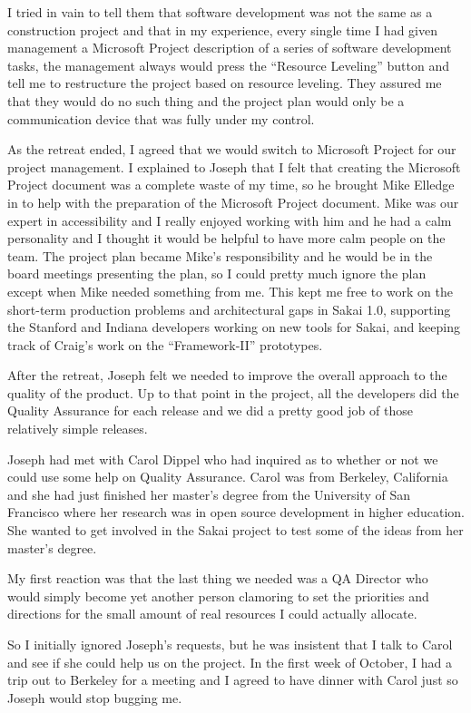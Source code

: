 \documentclass[12pt]{book}
\begin{document}
I tried in vain to tell them that software development
was not the same as a construction project and that
in my experience, every single time I had given management
a Microsoft Project description of a series of software
development tasks, the management always would press
the ``Resource Leveling'' button and tell me to
restructure the project based on resource leveling.
They assured me that they would do no such thing and
the project plan would only be a communication device
that was fully under my control.

As the retreat ended, I agreed that we would switch
to Microsoft Project for our project management.
I explained to Joseph that I felt that creating the Microsoft Project
document was a complete waste of my time, so he
brought Mike Elledge in to help with the preparation
of the Microsoft Project document.  Mike was our expert
in accessibility and I really enjoyed working with him
and he had a calm personality and I thought it would
be helpful to have more calm people on the team.
The project plan became Mike's responsibility
and he would be in the board meetings presenting
the plan, so I could pretty much ignore the plan
except when Mike needed something from me.
This kept me free to work on the short-term production
problems and architectural gaps in Sakai 1.0, supporting
the Stanford and Indiana developers working on
new tools for Sakai, and keeping track of Craig's work
on the ``Framework-II'' prototypes.

After the retreat, Joseph felt we needed to
improve the overall approach to the quality of the product.
Up to that point in the project, all the developers
did the Quality Assurance for each release and we did a
pretty good job of those relatively simple releases.

Joseph had met with Carol Dippel who had
inquired as to whether or not we could use some help
on Quality Assurance.
Carol was from Berkeley, California
and she had just finished her master's degree
from the University of San Francisco
where her research was in open source development in higher education.
She wanted to get involved
in the Sakai project to test some of the ideas from
her master's degree.

My first reaction was that the last thing we needed
was a QA Director who would simply become
yet another person clamoring to set the priorities
and directions for the small amount of real resources
I could actually allocate.

So I initially ignored Joseph's requests, but he
was insistent that I talk to Carol and see if she
could help us on the project. In the first week
of October, I had a trip out to Berkeley for a meeting
and I agreed to have dinner with Carol just so Joseph
would stop bugging me.
\end{document}
